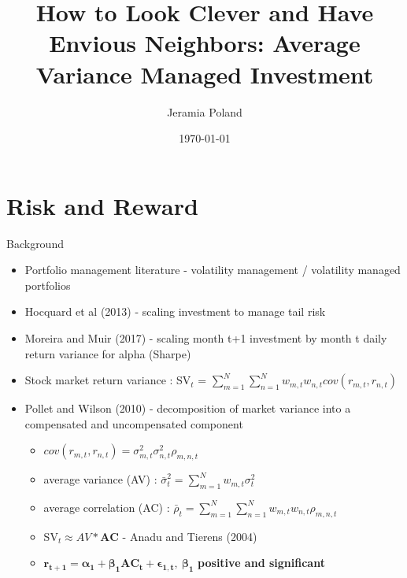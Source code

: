 \documentclass{beamer}
\begin{document}
\title[Average Variance]{How to Look Clever and Have Envious Neighbors: Average
	Variance Managed Investment}   
\author[J. Poland]{Jeramia Poland} 
\date{\today}

\begin{frame}
\titlepage
\end{frame}

\section{Risk and Reward}
\begin{frame}{Background}
	\begin{itemize}[<+->]
		\item Portfolio management literature - volatility management / volatility managed portfolios
		\item Hocquard et al (2013) - scaling investment to manage tail risk
		\item Moreira and Muir (2017) - scaling month t+1 investment by month t daily return variance for alpha (Sharpe)
		\item Stock market return variance : SV$_{t}$ = $\sum_{m=1}^{N}\sum_{n=1}^{N}w_{m,t}w_{n,t}cov(r_{m,t},r_{n,t})$
		\item Pollet and Wilson (2010) - decomposition of market variance into a compensated and uncompensated component
		\begin{itemize}[<+->]
			\item $cov(r_{m,t},r_{n,t})=\sigma^{2}_{m,t}\sigma^{2}_{n,t}\rho_{m,n,t}$
			\item average variance (AV) : $\bar{\sigma}^{2}_{t} = \sum_{m=1}^{N}w_{m,t}\sigma^{2}_{t}$
			\item average correlation (AC) : $\bar{\rho}_{t} = \sum_{m=1}^{N}\sum_{n=1}^{N}w_{m,t}w_{n,t}\rho_{m,n,t}$
			\item SV$_{t} \approx AV*\bm{AC}$  - Anadu and Tierens (2004)
			\item $\bm{r_{t+1} = \alpha_{1} + \beta_{1}AC_{t} + \epsilon_{1,t},~\beta_{1}}$ \textbf{positive and significant}

\end{itemize}
\end{itemize}
\end{frame}
\end{document}
